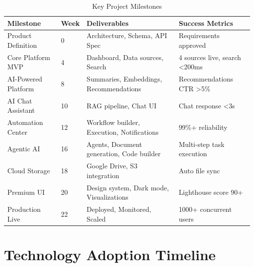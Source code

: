 \documentclass[12pt,oneside]{report}
\begin{document}
\begin{table}[h]
\centering
\caption{Key Project Milestones}
\begin{tabular}{|p{2cm}|p{3cm}|p{4cm}|p{3cm}|}
\hline
\rowcolor{lightgreen}
\textbf{Milestone} & \textbf{Week} & \textbf{Deliverables} & \textbf{Success Metrics} \\
\hline
Product Definition & 0 & Architecture, Schema, API Spec & Requirements approved \\
\hline
Core Platform MVP & 4 & Dashboard, Data sources, Search & 4 sources live, search <200ms \\
\hline
AI-Powered Platform & 8 & Summaries, Embeddings, Recommendations & Recommendations CTR >5\% \\
\hline
AI Chat Assistant & 10 & RAG pipeline, Chat UI & Chat response <3s \\
\hline
Automation Center & 12 & Workflow builder, Execution, Notifications & 99\%+ reliability \\
\hline
Agentic AI & 16 & Agents, Document generation, Code builder & Multi-step task execution \\
\hline
Cloud Storage & 18 & Google Drive, S3 integration & Auto file sync \\
\hline
Premium UI & 20 & Design system, Dark mode, Visualizations & Lighthouse score 90+ \\
\hline
Production Live & 22 & Deployed, Monitored, Scaled & 1000+ concurrent users \\
\hline
\end{tabular}
\end{table}

\chapter{Technology Adoption Timeline}
\end{document}
